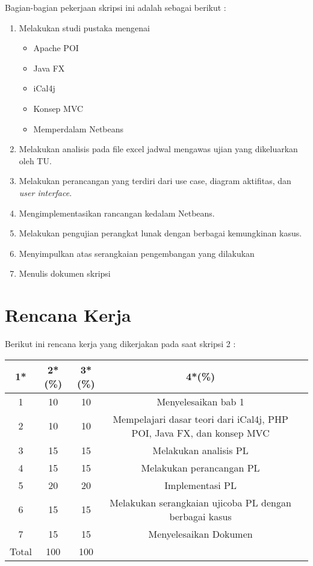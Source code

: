 \documentclass[a4paper,twoside]{article}
\begin{document}
Bagian-bagian pekerjaan skripsi ini adalah sebagai berikut :
	\begin{enumerate}
		\item Melakukan studi pustaka mengenai
			\begin{itemize}
				\item Apache POI
				\item Java FX
				\item iCal4j
				\item Konsep MVC
				\item Memperdalam Netbeans
			\end{itemize}
		\item Melakukan analisis pada file excel jadwal mengawas ujian yang dikeluarkan oleh TU.
		\item Melakukan perancangan yang terdiri dari use case, diagram aktifitas, dan \textit{user interface}.
		\item Mengimplementasikan rancangan kedalam Netbeans. 
		\item Melakukan pengujian perangkat lunak dengan berbagai kemungkinan kasus.
		\item Menyimpulkan atas serangkaian pengembangan yang dilakukan
		\item Menulis dokumen skripsi
	\end{enumerate}

\section{Rencana Kerja}
Berikut ini rencana kerja yang dikerjakan pada saat skripsi 2 :

\begin{center}
  \begin{tabular}{ | c | c | c | c | l |}
    \hline
    1*  & 2*(\%) & 3*(\%) & 4*(\%) \\ \hline \hline
    1   & 10 & 10  &    {\footnotesize Menyelesaikan bab 1}\\ \hline
    2   & 10  & 10  &  {\footnotesize Mempelajari dasar teori dari iCal4j, PHP POI, Java FX, dan konsep MVC}  \\ \hline
    3   & 15  & 15  &  {\footnotesize Melakukan analisis PL} \\ \hline
    4   & 15 &  15 &  {\footnotesize Melakukan perancangan PL}\\ \hline 
    5   & 20  & 20  &   {\footnotesize Implementasi PL}\\ \hline
    6   & 15  &  15 &   {\footnotesize Melakukan serangkaian ujicoba PL dengan berbagai kasus}\\ \hline 
    7   & 15  & 15  &  {\footnotesize Menyelesaikan Dokumen}\\ \hline
    Total  & 100  & 100  &   \\ \hline
    \end{tabular}
\end{center}
\end{document}
